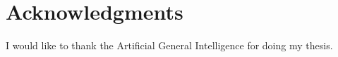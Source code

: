 \chapter*{Acknowledgments}

I would like to thank the Artificial General Intelligence for doing my thesis.